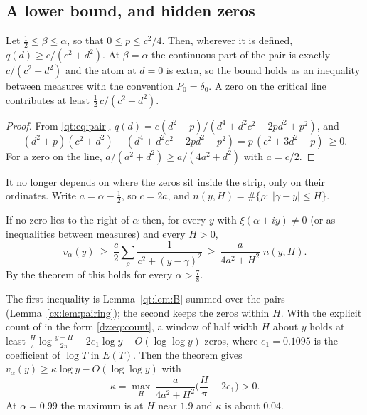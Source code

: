 \subsection{A lower bound, and hidden zeros}\label{qt:sec:hidden}

\begin{lemma}[background]\label{qt:lem:B}
Let $\frac12\le\beta\le\alpha$, so that $0\le p\le c^2/4$. Then, wherever it is defined, $q(d)\ge c/(c^2+d^2)$. At $\beta=\alpha$ the continuous part of the pair is exactly $c/(c^2+d^2)$ and the atom at $d=0$ is extra, so the bound holds as an inequality between measures with the convention $P_0=\delta_0$. A zero on the critical line contributes at least $\frac12\,c/(c^2+d^2)$.
\end{lemma}

\begin{proof}
From \eqref{qt:eq:pair}, $q(d)=c(d^2+p)/(d^4+d^2c^2-2pd^2+p^2)$, and
\[
(d^2+p)(c^2+d^2)-(d^4+d^2c^2-2pd^2+p^2)=p\,(c^2+3d^2-p)\ \ge0 .
\]
For a zero on the line, $a/(a^2+d^2)\ge a/(4a^2+d^2)$ with $a=c/2$.
\end{proof}

It no longer depends on where the zeros sit inside the strip, only on their ordinates. Write $a=\alpha-\frac12$, so $c=2a$, and $n(y,H)=\#\{\rho:\ |\gamma-y|\le H\}$.

\begin{theorem}\label{qt:thm:C}
If no zero lies to the right of $\alpha$ then, for every $y$ with $\xi(\alpha+iy)\ne0$ (or as inequalities between measures) and every $H>0$,
\[
v_\alpha(y)\ \ge\ \frac c2\sum_\rho\frac1{c^2+(y-\gamma)^2}\ \ge\ \frac{a}{4a^2+H^2}\;n(y,H).
\]
By the theorem of \cite{OAI26a} this holds for every $\alpha>\frac78$.
\end{theorem}

The first inequality is Lemma~\ref{qt:lem:B} summed over the pairs (Lemma~\ref{cx:lem:pairing}); the second keeps the zeros within $H$. With the explicit count of \cite{HSW22} in the form \eqref{dz:eq:count}, a window of half width $H$ about $y$ holds at least $\frac H\pi\log\frac{y-H}{2\pi}-2e_1\log y-O(\log\log y)$ zeros, where $e_1=0.1095$ is the coefficient of $\log T$ in $E(T)$. Then the theorem gives $v_\alpha(y)\ge\kappa\log y-O(\log\log y)$ with
\[
\kappa=\max_H\ \frac{a}{4a^2+H^2}\Big(\frac H\pi-2e_1\Big)>0 .
\]
At $\alpha=0.99$ the maximum is at $H$ near $1.9$ and $\kappa$ is about $0.04$. %

